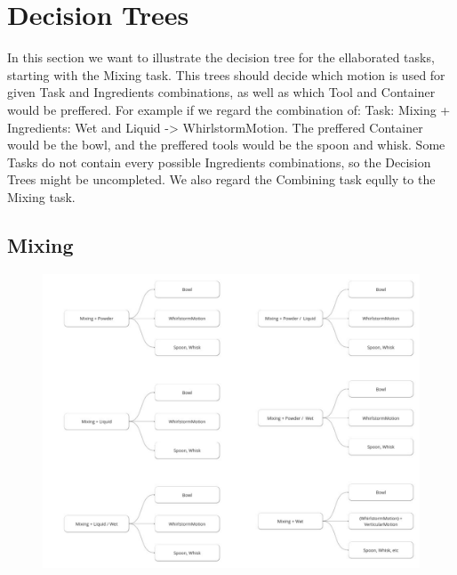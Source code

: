 \section*{Decision Trees}
In this section we want to illustrate the decision tree for the ellaborated tasks, starting with the Mixing task.
This trees should decide which motion is used for given Task and Ingredients combinations, as well as which Tool and Container would be preffered.
For example if we regard the combination of: \newline Task: Mixing + Ingredients: Wet and Liquid -> WhirlstormMotion. The preffered Container would be the bowl, and the preffered tools would be the spoon and whisk.
Some Tasks do not contain every possible Ingredients combinations, so the Decision Trees might be uncompleted. We also regard the Combining task eqully to the Mixing task.

\subsection*{Mixing}
\begin{figure}[H]
\includegraphics[scale=0.5]{Graphics/MixingDT.pdf}
\end{figure}

